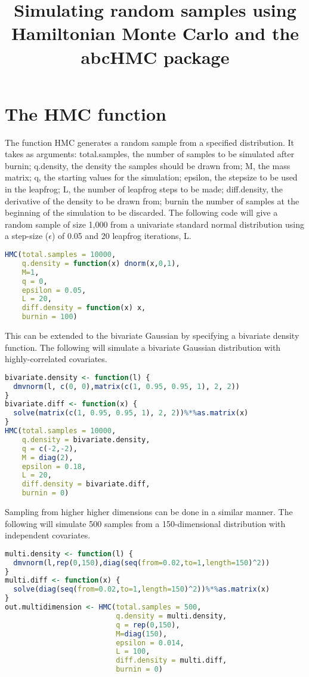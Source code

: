 \documentclass[10pt,a4paper,portrait]{article}
\title{Simulating random samples using Hamiltonian Monte Carlo and the abcHMC package}
\begin{document}
\maketitle
\section{The HMC function}
The function HMC generates a random sample from a specified distribution. It
takes as arguments: total.samples, the number of samples to be simulated after
burnin; q.density, the density the samples should be drawn from; M, the mass
matrix; q, the starting values for the simulation; epsilon, the stepsize to be used in the leapfrog; L, the number of leapfrog steps to be made; diff.density, the derivative of the density to be drawn from; burnin the number of samples at
the beginning of the simulation to be discarded.
The following code will give a random sample of size 1,000 from a univariate
standard normal distribution using a step-size ($\epsilon$) of 0.05 and 20 leapfrog iterations, L.
\begin{lstlisting}[backgroundcolor = \color{lightgray},
                   language = R,
                   framexleftmargin = 1em]
HMC(total.samples = 10000, 
    q.density = function(x) dnorm(x,0,1), 
    M=1, 
    q = 0, 
    epsilon = 0.05, 
    L = 20, 
    diff.density = function(x) x, 
    burnin = 100)
\end{lstlisting}

This can be extended to the bivariate Gaussian by specifying a bivariate density
function. The following will simulate a bivariate Gaussian distribution with
highly-correlated covariates.

\begin{lstlisting}[backgroundcolor = \color{lightgray},
                   language = R,
                   framexleftmargin = 1em]
bivariate.density <- function(l) {
  dmvnorm(l, c(0, 0),matrix(c(1, 0.95, 0.95, 1), 2, 2))
}
bivariate.diff <- function(x) {
  solve(matrix(c(1, 0.95, 0.95, 1), 2, 2))%*%as.matrix(x)
}
HMC(total.samples = 10000, 
    q.density = bivariate.density, 
    q = c(-2,-2), 
    M = diag(2), 
    epsilon = 0.18, 
    L = 20, 
    diff.density = bivariate.diff, 
    burnin = 0)
\end{lstlisting}

Sampling from higher higher dimensions can be done in a similar manner. The
following will simulate 500 samples from a 150-dimensional distribution with
independent covariates.
\begin{lstlisting}[backgroundcolor = \color{lightgray},
                   language = R,
                   framexleftmargin = 1em]
multi.density <- function(l) {
  dmvnorm(l,rep(0,150),diag(seq(from=0.02,to=1,length=150)^2))
}
multi.diff <- function(x) {
  solve(diag(seq(from=0.02,to=1,length=150)^2))%*%as.matrix(x)
}
out.multidimension <- HMC(total.samples = 500, 
                          q.density = multi.density, 
                          q = rep(0,150), 
                          M=diag(150), 
                          epsilon = 0.014, 
                          L = 100, 
                          diff.density = multi.diff, 
                          burnin = 0)
\end{lstlisting}
\end{document}
